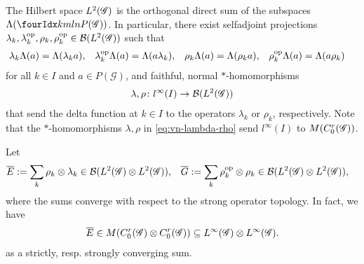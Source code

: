 The Hilbert space $L^{2}(\mathscr{G})$ is the orthogonal direct sum of the
subspaces $\Lambda(\Gr{P(\mathscr{G})}{k}{l}{m}{n})$. In particular, there exist
selfadjoint projections $\lambda_{k},\lambda_{k}^{\operatorname{\mathrm{op}}},\rho_{k},\rho_{k}^{\operatorname{\mathrm{op}}}\in
{\cal B}(L^{2}(\mathscr{G}))$ such that
\begin{align*}
  \lambda_{k}\Lambda(a)&= \Lambda(\lambda_{k} a), &
  \lambda^{\operatorname{\mathrm{op}}}_{k}\Lambda(a) &= \Lambda(a\lambda_{k}), &
  \rho_{k}\Lambda(a) &= \Lambda(\rho_{k}a), &
  \rho_{k}^{\operatorname{\mathrm{op}}}\Lambda(a) &= \Lambda(a\rho_{k})
\end{align*}
for all $k\in I$ and $a\in P(\mathscr{G})$, and faithful, normal $*$-homomorphisms
\begin{align} \label{eq:vn-lambda-rho}
  \lambda,\rho \colon l^{\infty}(I) \to
  {\cal B}(L^{2}(\mathscr{G}))
\end{align}
that send the delta function at $k\in I$ to the operators
$\lambda_{k}$ or $\rho_{k}$, respectively. Note that
 the $*$-homomorphisms $\lambda,\rho$ in
\eqref{eq:vn-lambda-rho} send $l^{\infty}(I)$ to $M(C^{r}_{0}(\mathscr{G}))$.

Let
\begin{align*}
  \overline{E} &:=\sum_{k} \rho_{k} \otimes \lambda_{k} \in \mathcal{B}(L^{2}(\mathscr{G})
  \otimes L^{2}(\mathscr{G})), & \overline{G} &:=
  \sum_{k} \rho_{k}^{\operatorname{\mathrm{op}}} \otimes \rho_{k} \in \mathcal{B}(L^{2}(\mathscr{G})
  \otimes L^{2}(\mathscr{G})),
\end{align*}
where the sums converge with respect to the strong operator
topology. In fact, we have
\begin{align*}
  \overline{E} \in M(C^{r}_{0}(\mathscr{G}) \otimes C^{r}_{0}(\mathscr{G})) \subseteq L^{\infty}(\mathscr{G}) \otimes L^{\infty}(\mathscr{G}).
\end{align*}
as a strictly, resp. strongly converging sum.

